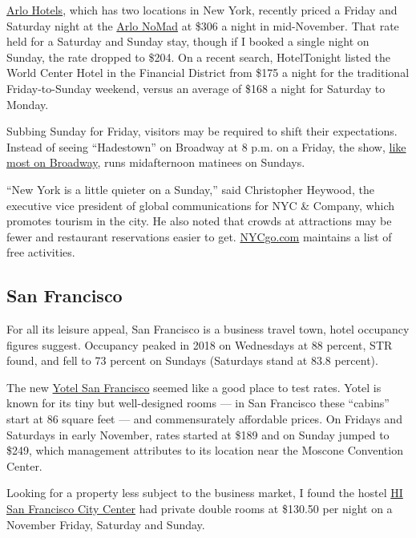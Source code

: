 \href{https://www.arlohotels.com/}{Arlo Hotels}, which has two locations
in New York, recently priced a Friday and Saturday night at the
\href{https://www.arlohotels.com/arlo-nomad/}{Arlo NoMad} at \$306 a
night in mid-November. That rate held for a Saturday and Sunday stay,
though if I booked a single night on Sunday, the rate dropped to \$204.
On a recent search, HotelTonight listed the World Center Hotel in the
Financial District from \$175 a night for the traditional
Friday-to-Sunday weekend, versus an average of \$168 a night for
Saturday to Monday.

Subbing Sunday for Friday, visitors may be required to shift their
expectations. Instead of seeing ``Hadestown'' on Broadway at 8 p.m. on a
Friday, the show, \href{https://www.broadway.org/performance-times}{like
most on Broadway}, runs midafternoon matinees on Sundays.

``New York is a little quieter on a Sunday,'' said Christopher Heywood,
the executive vice president of global communications for NYC \&
Company, which promotes tourism in the city. He also noted that crowds
at attractions may be fewer and restaurant reservations easier to get.
\href{https://www.nycgo.com/maps-guides/free-in-nyc}{NYCgo.com}
maintains a list of free activities.

\hypertarget{san-francisco}{%
\subsection{San Francisco}\label{san-francisco}}

For all its leisure appeal, San Francisco is a business travel town,
hotel occupancy figures suggest. Occupancy peaked in 2018 on Wednesdays
at 88 percent, STR found, and fell to 73 percent on Sundays (Saturdays
stand at 83.8 percent).

The new \href{https://www.yotel.com/en/hotels/yotel-san-francisco}{Yotel
San Francisco} seemed like a good place to test rates. Yotel is known
for its tiny but well-designed rooms --- in San Francisco these
``cabins'' start at 86 square feet --- and commensurately affordable
prices. On Fridays and Saturdays in early November, rates started at
\$189 and on Sunday jumped to \$249, which management attributes to its
location near the Moscone Convention Center.

Looking for a property less subject to the business market, I found the
hostel
\href{https://www.hiusa.org/hostels/california/san-francisco/city-center}{HI
San Francisco City Center} had private double rooms at \$130.50 per
night on a November Friday, Saturday and Sunday.

